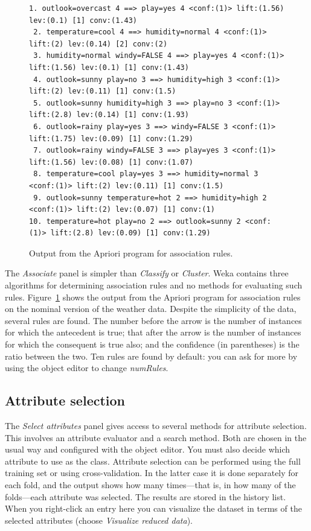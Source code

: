 \begin{figure}[!ht]
\begin{mdframed}[innermargin=-1.5cm]
\begin{Verbatim}[fontsize=\scriptsize]
 1. outlook=overcast 4 ==> play=yes 4 <conf:(1)> lift:(1.56) lev:(0.1) [1] conv:(1.43)
 2. temperature=cool 4 ==> humidity=normal 4 <conf:(1)> lift:(2) lev:(0.14) [2] conv:(2)
 3. humidity=normal windy=FALSE 4 ==> play=yes 4 <conf:(1)> lift:(1.56) lev:(0.1) [1] conv:(1.43)
 4. outlook=sunny play=no 3 ==> humidity=high 3 <conf:(1)> lift:(2) lev:(0.11) [1] conv:(1.5)
 5. outlook=sunny humidity=high 3 ==> play=no 3 <conf:(1)> lift:(2.8) lev:(0.14) [1] conv:(1.93)
 6. outlook=rainy play=yes 3 ==> windy=FALSE 3 <conf:(1)> lift:(1.75) lev:(0.09) [1] conv:(1.29)
 7. outlook=rainy windy=FALSE 3 ==> play=yes 3 <conf:(1)> lift:(1.56) lev:(0.08) [1] conv:(1.07)
 8. temperature=cool play=yes 3 ==> humidity=normal 3 <conf:(1)> lift:(2) lev:(0.11) [1] conv:(1.5)
 9. outlook=sunny temperature=hot 2 ==> humidity=high 2 <conf:(1)> lift:(2) lev:(0.07) [1] conv:(1)
10. temperature=hot play=no 2 ==> outlook=sunny 2 <conf:(1)> lift:(2.8) lev:(0.09) [1] conv:(1.29)
\end{Verbatim}
\end{mdframed}
\caption{\label{fig:apriori_output}Output from the Apriori program for association rules.}
\end{figure}

The \textit{Associate} panel is simpler than \textit{Classify} or
\textit{Cluster}. Weka contains three algorithms for determining
association rules and no methods for evaluating such
rules. Figure~\ref{fig:apriori_output} shows the output from the
Apriori program for association rules on the nominal version of the
weather data. Despite the simplicity of the data, several rules are
found. The number before the arrow is the number of instances for
which the antecedent is true; that after the arrow is the number of
instances for which the consequent is true also; and the confidence
(in parentheses) is the ratio between the two. Ten rules are found by
default: you can ask for more by using the object editor to change
\textit{numRules}.

\subsection{Attribute selection}

The \textit{Select attributes} panel gives access to several methods
for attribute selection. This involves an attribute evaluator and a
search method. Both are chosen in the usual way and configured with
the object editor. You must also decide which attribute to use as the
class. Attribute selection can be performed using the full training
set or using cross-validation. In the latter case it is done
separately for each fold, and the output shows how many times—that is,
in how many of the folds---each attribute was selected. The results are
stored in the history list. When you right-click an entry here you can
visualize the dataset in terms of the selected attributes (choose
\textit{Visualize reduced data}).

